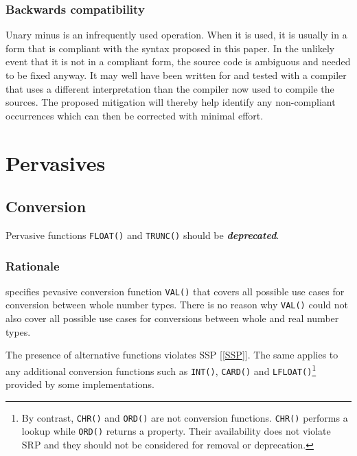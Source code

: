 \documentclass[10pt,a4paper]{article}
\renewcommand{\emph}[1]{\textbf{\textit{#1}}}
\begin{document}
\subsubsection{Backwards compatibility}

Unary minus is an infrequently used operation. When it is used, it is usually
in a form that is compliant with the syntax proposed in this paper. In the
unlikely event that it is not in a compliant form, the source code is ambiguous
and needed to be fixed anyway. It may well have been written for and tested
with a compiler that uses a different interpretation than the compiler now
used to compile the sources. The proposed mitigation will thereby help
identify any non-compliant occurrences which can then be corrected with
minimal effort.


\section{Pervasives}

\subsection{Conversion}

Pervasive functions \verb|FLOAT()| and \verb|TRUNC()| should be
\emph{deprecated}.

\subsubsection{Rationale}

\cite[p.150]{Wirth88} specifies pevasive conversion function \verb|VAL()| that
covers all possible use cases for conversion between whole number types. There
is no reason why \verb|VAL()| could not also cover all possible use cases for
conversions between whole and real number types.

The presence of alternative functions violates SSP [\ref{SSP}]. The same
applies to any additional conversion functions such as \verb|INT()|,
\verb|CARD()| and \verb|LFLOAT()|\footnote{By contrast, \texttt{CHR()} and
\texttt{ORD()} are not conversion functions. \texttt{CHR()} performs a
lookup while \texttt{ORD()} returns a property. Their availability
does not violate SRP and they should not be considered for removal
or deprecation.} provided by some implementations.
 
\end{document}
